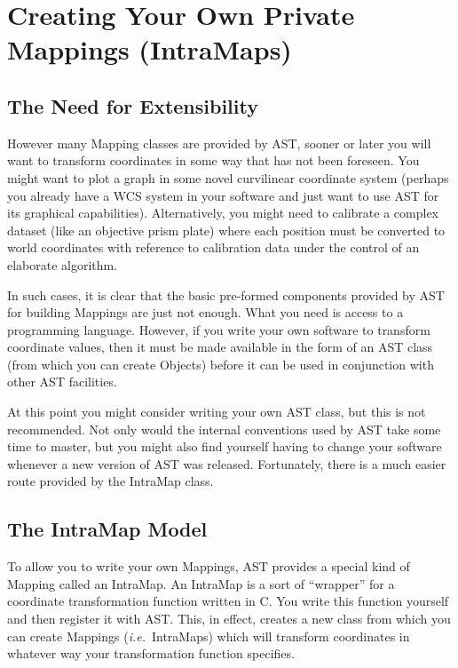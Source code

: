 \documentclass[twoside,11pt]{article}
\newcommand{\htmlref}[2]{#1}
\begin{document}
\cleardoublepage
\section{\label{ss:intramaps}Creating Your Own Private Mappings (IntraMaps)}

\subsection{The Need for Extensibility}

However many \htmlref{Mapping}{Mapping} classes are provided by AST, sooner or later you
will want to transform coordinates in some way that has not been
foreseen. You might want to plot a graph in some novel curvilinear
coordinate system (perhaps you already have a WCS system in your
software and just want to use AST for its graphical capabilities).
Alternatively, you might need to calibrate a complex dataset (like an
objective prism plate) where each position must be converted to world
coordinates with reference to calibration data under the control of an
elaborate algorithm.

In such cases, it is clear that the basic pre-formed components
provided by AST for building Mappings are just not enough. What you
need is access to a programming language. However, if you write your
own software to transform coordinate values, then it must be made
available in the form of an AST class (from which you can create
Objects) before it can be used in conjunction with other AST
facilities.

At this point you might consider writing your own AST class, but this
is not recommended. Not only would the internal conventions used by
AST take some time to master, but you might also find yourself having
to change your software whenever a new version of AST was
released. Fortunately, there is a much easier route provided by the
\htmlref{IntraMap}{IntraMap} class.

\subsection{The IntraMap Model}

To allow you to write your own Mappings, AST provides a special kind
of \htmlref{Mapping}{Mapping} called an \htmlref{IntraMap}{IntraMap}. An IntraMap is a sort of ``wrapper''
for a coordinate transformation function written in C. You write this
function yourself and then register it with AST. This, in effect,
creates a new class from which you can create Mappings
({\em{i.e.}}\ IntraMaps) which will transform coordinates in whatever
way your transformation function specifies.
\end{document}
